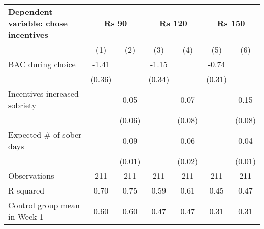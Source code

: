 \begin{tabular}{l c c c c c c} \toprule \textbf{Dependent variable: chose incentives} & \multicolumn{2}{c}{\textbf{Rs 90}} & \multicolumn{2}{c}{\textbf{Rs 120}} & \multicolumn{2}{c}{\textbf{Rs 150}} \\ \cmidrule(lr){2-3} \cmidrule(lr){4-5} \cmidrule(lr){6-7}&\multicolumn{1}{c}{(1)}&\multicolumn{1}{c}{(2)}&\multicolumn{1}{c}{(3)}&\multicolumn{1}{c}{(4)}&\multicolumn{1}{c}{(5)}&\multicolumn{1}{c}{(6)}\\
\midrule
BAC during choice   &       -1.41&            &       -1.15&            &       -0.74&            \\
                    &      (0.36)&            &      (0.34)&            &      (0.31)&            \\
\addlinespace
Incentives increased sobriety&            &        0.05&            &        0.07&            &        0.15\\
                    &            &      (0.06)&            &      (0.08)&            &      (0.08)\\
\addlinespace
Expected \#  of sober days&            &        0.09&            &        0.06&            &        0.04\\
                    &            &      (0.01)&            &      (0.02)&            &      (0.01)\\
\midrule
Observations        &         211&         211&         211&         211&         211&         211\\
R-squared           &        0.70&        0.75&        0.59&        0.61&        0.45&        0.47\\
Control group mean in Week 1&        0.60&        0.60&        0.47&        0.47&        0.31&        0.31\\
\bottomrule \end{tabular} 